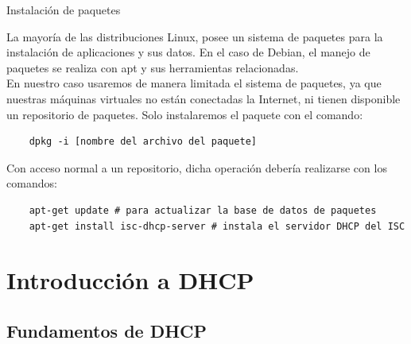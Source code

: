 \begin{frame}{Instalación de paquetes}

    La mayoría de las distribuciones Linux, posee un sistema de paquetes para
    la instalación de aplicaciones y sus datos. En el caso de Debian, el
    manejo de paquetes se realiza con apt y sus herramientas relacionadas.\\[0.2cm]

    En nuestro caso usaremos de manera limitada el sistema de paquetes, ya que
    nuestras máquinas virtuales no están conectadas la Internet, ni tienen
    disponible un repositorio de paquetes. Solo instalaremos el paquete con el
    comando:\\[0.2cm]

\begin{verbatim} 
    dpkg -i [nombre del archivo del paquete]
\end{verbatim}

    Con acceso normal a un repositorio, dicha operación debería realizarse con los
    comandos:\\[0.2cm]

\begin{verbatim} 
    apt-get update # para actualizar la base de datos de paquetes
    apt-get install isc-dhcp-server # instala el servidor DHCP del ISC
\end{verbatim}


\end{frame}


\section{Introducción a DHCP}

\subsection{Fundamentos de DHCP} %

\label{sub:Fundamentos de DHCP}


